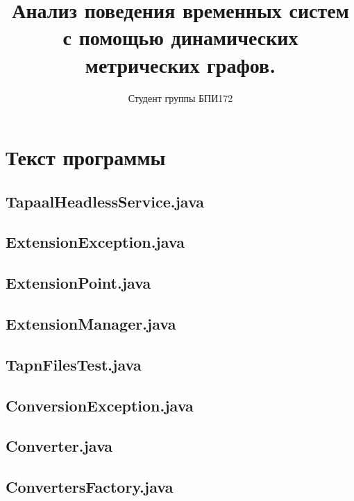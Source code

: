 \documentclass{../TechDoc}
\title{Анализ поведения временных систем с помощью динамических метрических графов.}
\author{Студент группы БПИ172}{А. А. Измайлов}
\begin{document}
	\maketitle
	\tableofcontents
	
	\section{Текст программы}
	\subsection{TapaalHeadlessService.java}
	
	\subsection{ExtensionException.java}
	
	\subsection{ExtensionPoint.java}
	
	\subsection{ExtensionManager.java}
	
	\subsection{TapnFilesTest.java}
	
	\subsection{ConversionException.java}
	
	\subsection{Converter.java}
	
	\subsection{ConvertersFactory.java}
	
\end{document}
